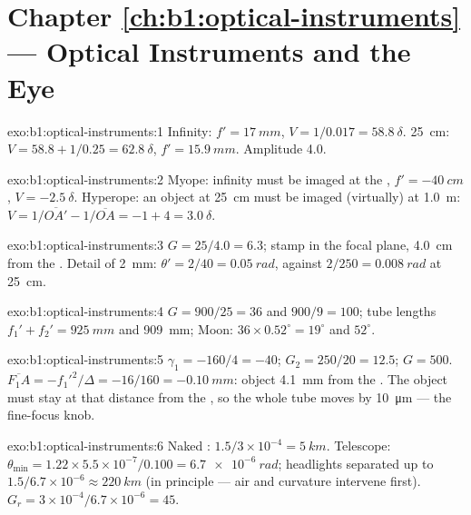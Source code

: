 \section*{Chapter \ref{ch:b1:optical-instruments} --- Optical Instruments and the Eye}

\begin{solution}{exo:b1:optical-instruments:1}
Infinity: $f' = \qty{17}{mm}$, $V = 1/0.017 = \qty{58.8}{\delta}$.
\qty{25}{cm}: $V = 58.8 + 1/0.25 = \qty{62.8}{\delta}$, $f' = \qty{15.9}{mm}$.
Amplitude \qty{4.0}{\delta}.
\end{solution}

\begin{solution}{exo:b1:optical-instruments:2}
Myope: infinity must be imaged at the , $f' = \qty{-40}{cm}$,
$V = \qty{-2.5}{\delta}$. Hyperope: an object at \qty{25}{cm} must be
imaged (virtually) at \qty{1.0}{m}: $V = 1/\overline{OA'} - 1/\overline{OA}
= -1 + 4 = \qty{+3.0}{\delta}$.
\end{solution}

\begin{solution}{exo:b1:optical-instruments:3}
$G = 25/4.0 = 6.3$; stamp in the focal plane, \qty{4.0}{cm} from the
. Detail of \qty{2}{mm}: $\theta' = 2/40 = \qty{0.05}{rad}$, against
$2/250 = \qty{0.008}{rad}$ at \qty{25}{cm}.
\end{solution}

\begin{solution}{exo:b1:optical-instruments:4}
$G = 900/25 = 36$ and $900/9 = 100$; tube lengths $f_1' + f_2' =
\qty{925}{mm}$ and \qty{909}{mm}; Moon: $36 \times 0.52^\circ = 19^\circ$
and $52^\circ$.
\end{solution}

\begin{solution}{exo:b1:optical-instruments:5}
$\gamma_1 = -160/4 = -40$; $G_2 = 250/20 = 12.5$; $G = 500$.
$\overline{F_1A} = -f_1'^2/\Delta = -16/160 = \qty{-0.10}{mm}$: object
\qty{4.1}{mm} from the . The object must stay at that distance
from the , so the whole tube moves by \qty{10}{\micro m} ---
the fine-focus knob.
\end{solution}

\begin{solution}{exo:b1:optical-instruments:6}
Naked : $1.5/3\times10^{-4} = \qty{5}{km}$. Telescope: $\theta_{\min}
= 1.22 \times 5.5\times10^{-7}/0.100 = \qty{6.7e-6}{rad}$; headlights
separated up to $1.5/6.7\times10^{-6} \approx \qty{220}{km}$ (in
principle --- air and curvature intervene first). $G_r = 3\times10^{-4}/
6.7\times10^{-6} = 45$.
\end{solution}

